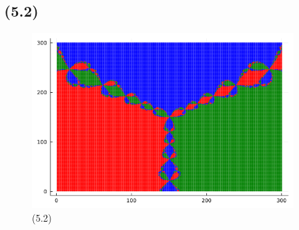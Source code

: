 \documentclass[uplatex, dvipdfmx, a4j,11pt]{jsarticle}
\begin{document}
\newpage
\subsection*{(5.2)}
\begin{figure}[h]
  \begin{center}
    \includegraphics[width=100mm]{newton_method_advaned.png}
    \caption{(5.2)}
  \end{center}
\end{figure}
\end{document}
